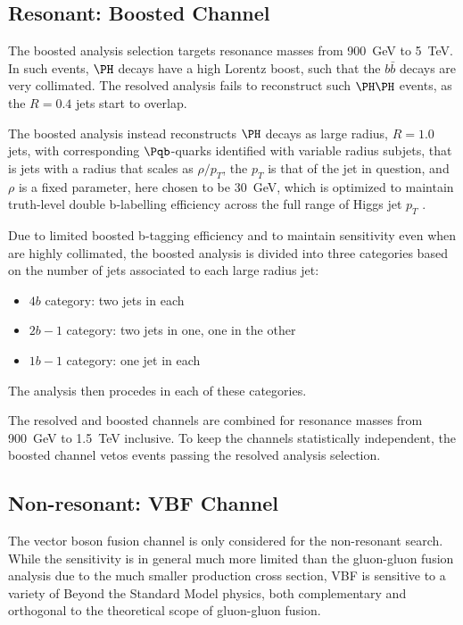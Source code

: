 \subsection{Resonant: Boosted Channel}
The boosted analysis selection targets resonance masses from \SI{900}{\GeV} to \SI{5}{\TeV}.
In such events, $\higgs$ decays have a high Lorentz boost, such that the $b\bar{b}$ decays are
very collimated. The resolved analysis fails to reconstruct such $\higgs\higgs$ events, as the 
$R=0.4$ jets start to overlap. 

The boosted analysis instead reconstructs $\higgs$ decays as large radius, $R=1.0$ jets, with 
corresponding $\Pqb$-quarks identified with variable radius subjets, that is jets with a 
radius that scales as $\rho / p_{T}$, the $p_{T}$ is that of the jet in question, and
$\rho$ is a fixed parameter, here chosen to be \SI{30}{\GeV}, which is optimized to maintain 
truth-level double b-labelling efficiency across the full range of Higgs jet $p_{T}$ 
.

Due to limited boosted b-tagging efficiency  and to maintain sensitivity 
even when \bjets are highly collimated, the boosted analysis is divided into three categories 
based on the number of \btagged jets associated to each large radius jet:
\begin{itemize}
	\item $4b$ category: two \btagged jets in each
	\item $2b-1$ category: two \btagged jets in one, one in the other
	\item $1b-1$ category: one \btagged jet in each
\end{itemize} 

The analysis then procedes in each of these categories.

The resolved and boosted channels are combined for resonance masses from \SI{900}{\GeV} 
to \SI{1.5}{\TeV} inclusive. To keep the channels statistically independent, the boosted channel 
vetos events passing the resolved analysis selection.


\subsection{Non-resonant: VBF Channel} 
The vector boson fusion channel is only considered for the non-resonant search. While the 
sensitivity is in general much more limited than the gluon-gluon fusion analysis due to the 
much smaller production cross section, VBF is sensitive to a variety of Beyond the Standard 
Model physics, both complementary and orthogonal to the theoretical scope of gluon-gluon fusion. 

